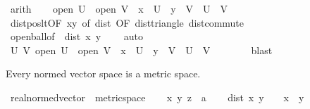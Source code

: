 \begin{isabellebody}
\ arith\isanewline
\ \ \isamarkupfalse%
\ {\isachardoublequoteopen}open\ {\isacharquery}{\kern0pt}U\ {\isasymand}\ open\ {\isacharquery}{\kern0pt}V\ {\isasymand}\ x\ {\isasymin}\ {\isacharquery}{\kern0pt}U\ {\isasymand}\ y\ {\isasymin}\ {\isacharquery}{\kern0pt}V\ {\isasymand}\ {\isacharquery}{\kern0pt}U\ {\isasyminter}\ {\isacharquery}{\kern0pt}V\ {\isacharequal}{\kern0pt}\ {\isacharbraceleft}{\kern0pt}{\isacharbraceright}{\kern0pt}{\isachardoublequoteclose}\isanewline
\ \ \ \ \isamarkupfalse%
\ dist{\isacharunderscore}{\kern0pt}pos{\isacharunderscore}{\kern0pt}lt{\isacharbrackleft}{\kern0pt}OF\ xy{\isacharbrackright}{\kern0pt}\ {\isacharasterisk}{\kern0pt}{\isacharbrackleft}{\kern0pt}of\ dist{\isacharcomma}{\kern0pt}\ OF\ dist{\isacharunderscore}{\kern0pt}triangle\ dist{\isacharunderscore}{\kern0pt}commute{\isacharbrackright}{\kern0pt}\isanewline
\ \ \ \ \isamarkupfalse%
\ open{\isacharunderscore}{\kern0pt}ball{\isacharbrackleft}{\kern0pt}of\ {\isacharunderscore}{\kern0pt}\ {\isachardoublequoteopen}dist\ x\ y\ {\isacharslash}{\kern0pt}\ {}{\isachardoublequoteclose}{\isacharbrackright}{\kern0pt}\ \isamarkupfalse%
\ auto\isanewline
\ \ \isamarkupfalse%
\ \isamarkupfalse%
\ {\isachardoublequoteopen}{\isasymexists}U\ V{\isachardot}{\kern0pt}\ open\ U\ {\isasymand}\ open\ V\ {\isasymand}\ x\ {\isasymin}\ U\ {\isasymand}\ y\ {\isasymin}\ V\ {\isasymand}\ U\ {\isasyminter}\ V\ {\isacharequal}{\kern0pt}\ {\isacharbraceleft}{\kern0pt}{\isacharbraceright}{\kern0pt}{\isachardoublequoteclose}\isanewline
\ \ \ \ \isamarkupfalse%
\ blast\isanewline
{}\isamarkupfalse%
%
\endisatagproof
{\isafoldproof}%
%
\isadelimproof
%
\endisadelimproof
%
\begin{isamarkuptext}%
Every normed vector space is a metric space.%
\end{isamarkuptext}\isamarkuptrue%
\isamarkupfalse%
\ real{\isacharunderscore}{\kern0pt}normed{\isacharunderscore}{\kern0pt}vector\ {\isacharless}{\kern0pt}\ metric{\isacharunderscore}{\kern0pt}space\isanewline
%
\isadelimproof
%
\endisadelimproof
%
\isatagproof
{}\isamarkupfalse%
\isanewline
\ \ \isamarkupfalse%
\ x\ y\ z\ {\isacharcolon}{\kern0pt}{\isacharcolon}{\kern0pt}\ {\isacharprime}{\kern0pt}a\isanewline
\ \ \isamarkupfalse%
\ {\isachardoublequoteopen}dist\ x\ y\ {\isacharequal}{\kern0pt}\ {}\ {\isasymlongleftrightarrow}\ x\ {\isacharequal}{\kern0pt}\ y{\isachardoublequoteclose}\isanewline

\end{isabellebody}
